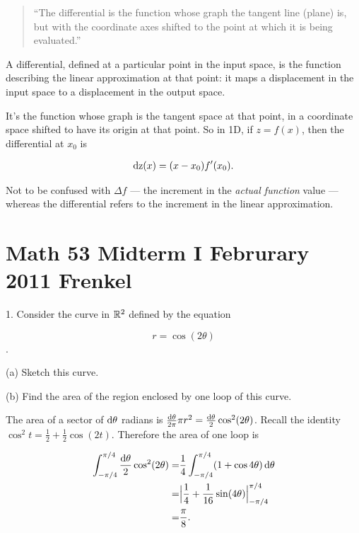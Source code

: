 \documentclass[12pt]{article}
\begin{document}
\begin{quote}
  ``The differential is the function whose graph the tangent line (plane) is,
  but with the coordinate axes shifted to the point at which it is being
  evaluated.''
\end{quote}

A differential, defined at a particular point in the input space, is the
function describing the linear approximation at that point: it maps a
displacement in the input space to a displacement in the output space.

It's the function whose graph is the tangent space at that point, in a
coordinate space shifted to have its origin at that point. So in 1D, if
$z = f(x)$, then the differential at $x_0$ is

\begin{align*}
  \operatorname{\text{dz}}(x) = (x - x_0)f'(x_0).
\end{align*}


Not to be confused with $\Delta f$ --- the increment in the \textit{actual
  function} value --- whereas the differential refers to the increment in the
linear approximation.


\newpage
\section*{Math 53 Midterm I Februrary 2011 Frenkel}

1. Consider the curve in $\mathbb{R}^2$ defined by the equation

$$
r = \cos(2\theta)
$$.

(a) Sketch this curve.

(b) Find the area of the region enclosed by one loop of this curve.\\

\begin{mdframed}
The area of a sector of $\operatorname{\text{d}\theta}$ radians is $\frac{\operatorname{\text{d}\theta}}{2\pi}\pi r^2 = \frac{\operatorname{\text{d}\theta}}{2}\cos^2(2\theta)$. Recall the identity $\cos^2 t = \frac{1}{2} + \frac{1}{2}\cos(2t)$. Therefore the area of one loop is

\begin{align*}
  \int_{-\pi/4}^{\pi/4} \frac{\operatorname{\text{d}\theta}}{2}\cos^2(2\theta)
  =&\frac{1}{4}\int_{-\pi/4}^{\pi/4} (1 + \cos 4\theta) \operatorname{\text{d}\theta} \\
  =& \Big|\frac{1}{4} + \frac{1}{16}\sin(4\theta)\Big|_{-\pi/4}^{\pi/4} \\
  =& \frac{\pi}{8}.
\end{align*}

\end{mdframed}~\\
\end{document}
